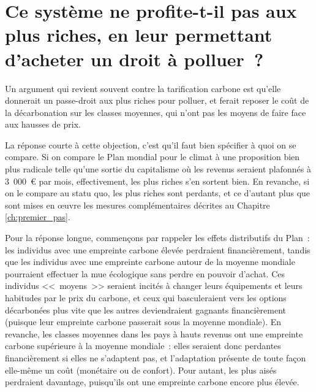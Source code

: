 \documentclass[a5paper,french,openany]{memoir}
\begin{document}
\section*{\normalsize Ce système ne profite-t-il pas aux plus riches, en leur permettant d'acheter un droit à polluer~?}\label{q:riches}

Un argument qui revient souvent contre la tarification carbone est qu'elle donnerait un passe-droit aux plus riches pour polluer, et ferait reposer le coût de la décarbonation sur les classes moyennes, qui n'ont pas les moyens de faire face aux hausses de prix. 

La réponse courte à cette objection, c'est qu'il faut bien spécifier à quoi on se compare. Si on compare le Plan mondial pour le climat à une proposition bien plus radicale telle qu'une sortie du capitalisme où les revenus seraient plafonnés à 3~000~\euro{} par mois, effectivement, les plus riches s'en sortent bien. En revanche, si on le compare au statu quo, les plus riches sont perdants, et ce d'autant plus que sont mises en œuvre les mesures complémentaires décrites au Chapitre \ref{ch:premier_pas}. 

Pour la réponse longue, commençons par rappeler les effets distributifs du Plan~: les individus avec une empreinte carbone élevée perdraient financièrement, tandis que les individus avec une empreinte carbone autour de la moyenne mondiale pourraient effectuer la mue écologique sans perdre en pouvoir d'achat. Ces individus <<~moyens~>> seraient incités à changer leurs équipements et leurs habitudes par le prix du carbone, et ceux qui basculeraient vers les options décarbonées plus vite que les autres deviendraient gagnants financièrement (puisque leur empreinte carbone passerait sous la moyenne mondiale). En revanche, les classes moyennes dans les pays à hauts revenus ont une empreinte carbone supérieure à la moyenne mondiale~: elles seraient donc perdantes financièrement si elles ne s'adaptent pas, et l'adaptation présente de toute façon elle-même un coût (monétaire ou de confort). Pour autant, les plus aisés perdraient davantage, puisqu'ils ont une empreinte carbone encore plus élevée. 
\end{document}
